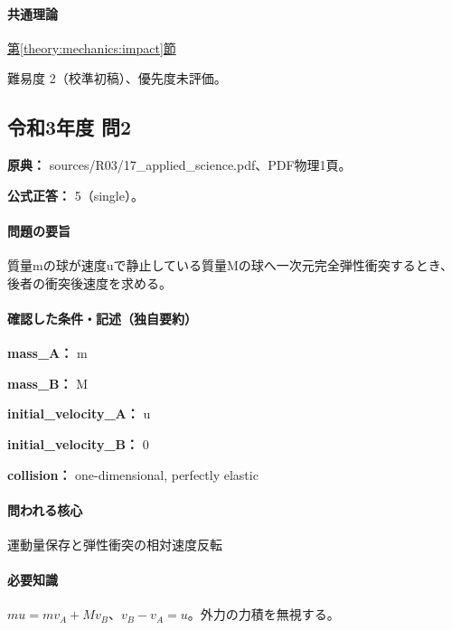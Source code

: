 \paragraph{共通理論} \hyperref[theory:mechanics:impact]{第\ref*{theory:mechanics:impact}節}

\par 難易度 2（校準初稿）、優先度未評価。

\subsection{令和3年度 問2}
\label{q:r03-reg-applied-02}

\noindent\textbf{原典：} sources/R03/17\_applied\_science.pdf、PDF物理1頁。

\textbf{公式正答：} 5（single）。

\paragraph{問題の要旨} 質量mの球が速度uで静止している質量Mの球へ一次元完全弾性衝突するとき、後者の衝突後速度を求める。

\paragraph{確認した条件・記述（独自要約）}\mbox{}\par

\noindent\textbf{mass\_A：} m\par

\noindent\textbf{mass\_B：} M\par

\noindent\textbf{initial\_velocity\_A：} u\par

\noindent\textbf{initial\_velocity\_B：} 0\par

\noindent\textbf{collision：} one-dimensional, perfectly elastic\par

\paragraph{問われる核心} 運動量保存と弾性衝突の相対速度反転

\paragraph{必要知識} \(mu=mv_A+Mv_B\)、\(v_B-v_A=u\)。外力の力積を無視する。

